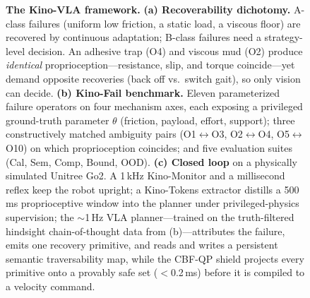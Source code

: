 \documentclass[conference]{IEEEtran}
\newcommand{\kinovla}{Kino-VLA}
\newcommand{\kinofail}{Kino-Fail}
\newcommand{\kinotokens}{Kino-Tokens}
\begin{document}
\begin{figure}[t]
\fi
\caption{\textbf{The \kinovla{} framework.} \textbf{(a) Recoverability dichotomy.}
A-class failures (uniform low friction, a static load, a viscous floor) are
recovered by continuous adaptation; B-class failures need a strategy-level
decision. An adhesive trap (O4) and viscous mud (O2) produce \emph{identical}
proprioception---resistance, slip, and torque coincide---yet demand opposite
recoveries (back off vs.\ switch gait), so only vision can decide. \textbf{(b)
\kinofail{} benchmark.} Eleven parameterized failure operators on four mechanism
axes, each exposing a privileged ground-truth parameter $\theta$ (friction,
payload, effort, support); three constructively matched ambiguity pairs
(O1$\leftrightarrow$O3, O2$\leftrightarrow$O4, O5$\leftrightarrow$O10) on which
proprioception coincides; and five evaluation suites (Cal, Sem, Comp, Bound, OOD).
\textbf{(c) Closed loop} on a physically simulated Unitree Go2. A \mbox{1\,kHz}
Kino-Monitor and a millisecond reflex keep the robot upright; a \kinotokens{}
extractor distills a \mbox{500\,ms} proprioceptive window into the planner under
privileged-physics supervision; the \mbox{$\sim$1\,Hz} VLA planner---trained on the
truth-filtered hindsight chain-of-thought data from (b)---attributes the failure,
emits one recovery primitive, and reads and writes a persistent semantic
traversability map, while the CBF-QP shield projects every primitive onto a
provably safe set ($<$\mbox{0.2\,ms}) before it is compiled to a velocity command.}
\label{fig:system}
\end{figure}
\end{document}
